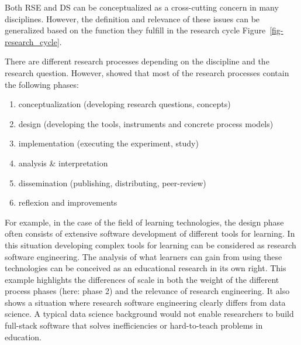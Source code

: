 \documentclass[
        english,biblatex
    ]{lni}
\providecommand{\tightlist}{%
    \setlength{\itemsep}{0pt}\setlength{\parskip}{0pt}}
\begin{document}
    Both RSE and DS can be conceptualized as a cross-cutting concern in
    many disciplines. However, the definition and relevance of these
    issues can be generalized based on the function they fulfill in the
    research cycle Figure~\ref{fig-research_cycle}.

    There are different research processes depending on the discipline
    and the research question. However, \autocite{Dehne2021} showed that
    most of the research processes contain the following phases:

    \begin{enumerate}
    \def\labelenumi{\arabic{enumi}.}
    \tightlist
    \item
      conceptualization (developing research questions, concepts)
    \item
      design (developing the tools, instruments and concrete process
      models)
    \item
      implementation (executing the experiment, study)
    \item
      analysis \& interpretation
    \item
      dissemination (publishing, distributing, peer-review)
    \item
      reflexion and improvements
    \end{enumerate}

    For example, in the case of the field of learning technologies, the
    design phase often consists of extensive software development of
    different tools for learning. In this situation developing complex
    tools for learning can be considered as research software
    engineering. The analysis of what learners can gain from using these
    technologies can be conceived as an educational research in its own
    right. This example highlights the differences of scale in both the
    weight of the different process phases (here: phase 2) and the
    relevance of research engineering. It also shows a situation where
    research software engineering clearly differs from data science. A
    typical data science background would not enable researchers to
    build full-stack software that solves inefficiencies or
    hard-to-teach problems in education.
\end{document}
